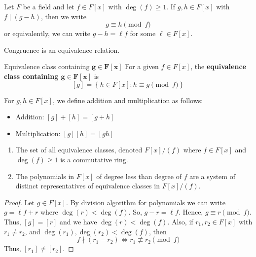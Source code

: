 \begin{Definition}{}{}
    Let $ F $ be a field and let $ f\in F[x] $ with $ \deg(f)\geqslant 1 $.
    If $ g,h\in F[x] $ with $ f\mid (g-h) $, then we write
    \[ g\equiv h \pmod{f} \]
    or equivalently, we can write $ g-h=\ell f $ for some $ \ell\in F[x] $.
\end{Definition}

\begin{Theorem}{}{}
    Congruence is an equivalence relation.
\end{Theorem}

\begin{Definition}{Equivalence class containing $\bm{g\in F[x]}$}{}
    For a given $ f\in F[x] $, the \textbf{equivalence class containing $\bm{g\in F[x]}$}
    is
    \[ [g]=\left\{h\in F[x]: h\equiv g\pmod{f}\right\} \]
\end{Definition}

\begin{Definition}{}{}
    For $ g,h\in F[x] $, we define addition and multiplication as follows:
    \begin{itemize}
        \item Addition: $ [g]+[h]=[g+h] $
        \item Multiplication: $ [g][h]=[gh] $
    \end{itemize}
\end{Definition}

\begin{Theorem}{}{}
    \begin{enumerate}[label=(\arabic*)]
        \item The set of all equivalence classes, denoted $ F[x]/(f) $
              where $ f\in F[x] $ and $ \deg(f)\geqslant 1 $ is a
              commutative ring.
        \item The polynomials in $ F[x] $ of degree less than degree of $ f $
              are a system of distinct representatives of equivalence classes in
              $ F[x]/(f)$.
    \end{enumerate}
\end{Theorem}

\begin{proof}
    Let $ g\in F[x] $. By division algorithm for polynomials we can write
    $ g=\ell f+r $ where $ \deg(r)<\deg(f) $. So, $ g-r=\ell f $. Hence,
    $ g\equiv r\pmod{f} $. Thus, $ [g]=[r] $ and we have $ \deg(r)<\deg(f) $.
    Also, if $ r_1,r_2\in F[x] $ with $ r_1\neq r_2 $, and
    $ \deg(r_1),\deg(r_2)<\deg(f) $, then
    \[ f\nmid (r_1-r_2)\iff r_1\not\equiv r_2\pmod{f} \]
    Thus, $ [r_1]\neq [r_2] $.
\end{proof}
